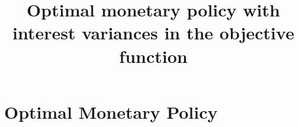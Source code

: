 \def\CTeXPreproc{Created by ctex v0.2.5, don't edit!}\documentclass[12pt]{article}
\numberwithin{equation}{section}
\begin{document}
\title{Optimal monetary policy with interest variances in the objective function}



\maketitle





\section{Optimal Monetary Policy}
\label{sec:MonPol}
\end{document}
